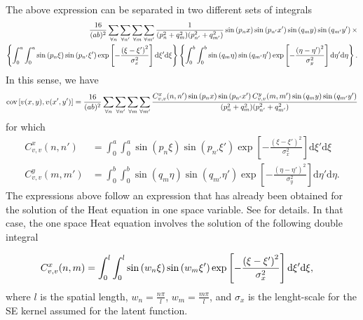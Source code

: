 \documentclass[a4paper,10pt]{article}
\newcommand{\dif}{\textrm{d}}
\DeclareMathOperator{\cov}{cov} \DeclareMathOperator{\ex}{E}
\begin{document}
The above expression can be separated in two different sets of integrals
\begin{align}\notag
\frac{16}{(ab)^2}\sum_{\forall
  n}\sum_{\forall n'}\sum_{\forall m}\sum_{\forall m'}
\frac{1}{(p_n^2 + q_m^2)(p_{n'}^2 + q_{m'}^2)}
\sin\left(p_nx\right)
\sin\left(p_{n'}x'\right) \sin\left(q_my\right)
\sin\left(q_{m'}y'\right)\times\\\notag
\left\{\int_0^a\int_0^a\sin\left(p_n\xi\right)
\sin\left(p_{n'}\xi'\right)\exp\left[-\frac{\left(\xi-\xi'\right)^2}{\sigma^2_x}\right]\dif\xi'\dif\xi\right\}
\left\{\int_0^b\int_0^b\sin\left(q_m \eta\right)
\sin\left(q_{m'}\eta'\right)\exp\left[-\frac{\left(\eta-\eta'\right)^2}{\sigma^2_y}\right]\dif\eta'\dif\eta\right\}.
\end{align}
In this sense, we have
\begin{align}\notag
\cov\left[v(x,y),v(x',y')\right]= \frac{16}{(ab)^2}\sum_{\forall
  n}\sum_{\forall n'}\sum_{\forall m}\sum_{\forall m'}
\frac{C^x_{v,v}(n,n') \sin\left(p_nx\right)
\sin\left(p_{n'}x'\right) C^y_{v,v}(m,m') \sin\left(q_my\right)
\sin\left(q_{m'}y'\right)}{(p_n^2 + q_m^2)(p_{n'}^2 + q_{m'}^2)}
\end{align}
for which
\begin{align}
C^x_{v,v}(n,n')&=\int_0^a\int_0^a\sin\left(p_n\xi\right)
\sin\left(p_{n'}\xi'\right)\exp\left[-\frac{\left(\xi-\xi'\right)^2}{\sigma^2_x}\right]\dif\xi'\dif\xi\label{eq:Cvvnnp}\\
C^y_{v,v}(m,m')&=\int_0^b\int_0^b\sin\left(q_m\eta\right)
\sin\left(q_{m'}\eta'\right)\exp\left[-\frac{\left(\eta-\eta'\right)^2}{\sigma^2_y}\right]\dif\eta'\dif\eta.
\end{align}
The expressions above follow an expression that has already been obtained for
the solution of the Heat equation in one space variable. See
\cite{Alvarez:HeatEquationReport} for details. In that case, the one
space Heat equation involves the solution of the following double
integral

\begin{align}\notag
C^{x}_{v,v}(n,m)&=\int_0^l\int_0^l\sin\left(w_n\xi\right)
\sin\left(w_m\xi'\right)\exp\left[-\frac{\left(\xi-\xi'\right)^2}{\sigma^2_x}\right]\dif\xi'\dif\xi,
\end{align}
where $l$ is the spatial length, $w_n= \frac{n\pi}{l}$,
$w_m=\frac{m\pi}{l}$, and $\sigma_x$ is the lenght-scale for the SE
kernel assumed for the latent function.
\end{document}
